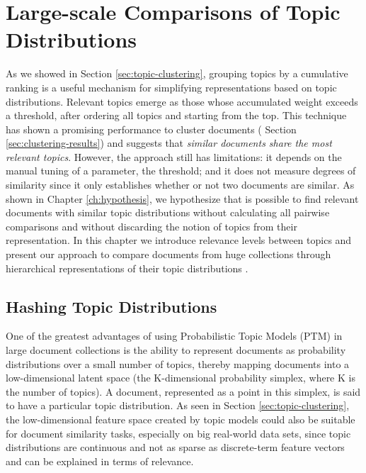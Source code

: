 

\chapter{Large-scale Comparisons of Topic Distributions}\label{ch:comparisons}

\graphicspath{{comparisons/figures/}}


As we showed in Section \ref{sec:topic-clustering}, grouping topics by a cumulative ranking is a useful mechanism for simplifying representations based on topic distributions. Relevant topics emerge as those whose accumulated weight exceeds a threshold, after ordering all topics and starting from the top. This technique has shown a promising performance to cluster documents ( Section \ref{sec:clustering-results}) and  suggests that \textit{similar documents share the most relevant topics}. However, the approach still has limitations: it depends on the manual tuning of a parameter, the threshold; and it does not measure degrees of similarity since it only establishes whether or not two documents are similar. As shown in Chapter \ref{ch:hypothesis}, we hypothesize that is possible to find relevant documents with similar topic distributions without calculating all pairwise comparisons and without discarding the notion of topics from their representation. In this chapter we introduce relevance levels between topics and present our approach to compare documents from huge collections through hierarchical representations of their topic distributions \citep{Badenes-Olmedo2019}.

\section{Hashing Topic Distributions}
\label{sec:comparison-hashing}

One of the greatest advantages of using Probabilistic Topic Models (PTM) in large document collections is the ability to represent documents as probability distributions over a small number of topics, thereby mapping documents into a low-dimensional latent space (the K-dimensional probability simplex, where K is the number of topics). A document, represented as a point in this simplex, is said to have a particular topic distribution. As seen in Section \ref{sec:topic-clustering}, the low-dimensional feature space created by topic models could also be suitable for document similarity tasks, especially on big real-world data sets, since topic distributions are continuous and not as sparse as discrete-term feature vectors and can be explained in terms of relevance. 


